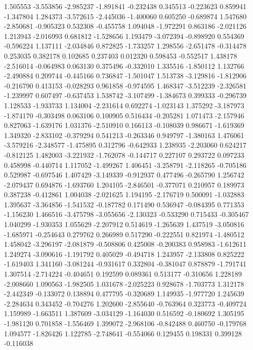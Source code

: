 1.505553
-3.553856
-2.985237
-1.891841
-0.232438
0.345513
-0.223623
0.859941
-1.347804
1.284373
-3.572615
-2.445036
-1.400060
0.605250
-0.689874
1.547680
-2.850681
-0.905323
0.532308
-0.455758
1.094048
-1.972291
0.863186
-2.021126
1.213943
-2.016993
0.681812
-1.528656
1.193479
-3.072394
-0.898920
0.554369
-0.596224
1.137111
-2.034846
0.872825
-1.733257
1.298556
-2.651478
-0.314478
0.253035
0.382178
0.102685
0.237403
0.012320
0.598453
-0.552517
1.438178
-2.516014
-0.064983
0.063130
0.375496
-0.332010
1.335516
-1.850112
1.132766
-2.490884
0.209744
-0.445166
0.736847
-1.501047
1.513738
-3.129816
-1.812906
-0.216790
0.413153
-0.028293
0.961858
-0.974595
1.468347
-3.512239
-2.326581
-1.239997
0.607497
-0.637453
1.538742
-3.107499
-1.384673
0.399333
-0.296739
1.128533
-1.933733
1.134004
-2.231614
0.692274
-1.023143
1.375292
-3.187973
-1.874170
-0.303498
0.063106
0.100905
0.516434
-0.205281
1.071473
-2.157946
0.827063
-1.639176
1.031376
-2.510910
0.166113
-0.108039
0.986671
-1.619369
1.349320
-2.833102
-0.379294
0.541213
-0.263346
0.949797
-1.380163
1.476061
-3.579216
-2.348577
-1.475895
0.312796
-0.642933
1.238935
-2.203060
0.624217
-0.812125
1.482003
-3.221932
-1.762078
-0.144717
0.227107
0.293722
0.097233
0.458998
-0.440714
1.117052
-1.499267
1.406451
-3.258791
-2.118265
-0.705186
0.529987
-0.697546
1.407429
-3.149339
-0.912937
0.477496
-0.265790
1.256742
-2.079437
0.694876
-1.693760
1.204105
-2.846501
-0.377071
0.210957
0.189973
0.387238
-0.412861
1.004038
-2.021625
1.194195
-2.176719
0.500091
-1.032883
1.395637
-3.364856
-1.541532
-0.187782
0.171490
0.536947
-0.084395
0.771353
-1.156230
1.466516
-3.475798
-3.055656
-2.130323
-0.533290
0.715433
-0.305467
1.040299
-1.930353
1.055629
-2.207912
0.514619
-1.265639
1.437519
-3.050816
-1.685971
-0.254643
0.279762
0.266989
0.517290
-0.222551
0.821974
-1.480512
1.458042
-3.296197
-2.081879
-0.508806
0.425008
-0.200383
0.958983
-1.612611
1.249274
-3.090616
-1.191792
0.405029
-0.494718
1.243957
-2.133808
0.825222
-1.619403
1.341160
-3.081244
-0.931617
0.332804
-0.381047
0.878879
-1.791741
1.307514
-2.714224
-0.404651
0.192599
0.089361
0.513177
-0.310656
1.228189
-2.008660
1.090563
-1.982505
1.031678
-2.025223
0.928678
-1.703773
1.312178
-2.442349
-0.133072
0.138894
0.477795
-0.320689
1.149935
-1.977720
1.245639
-2.284634
0.343452
-0.704276
1.202600
-2.855640
-0.763964
0.323773
-0.409724
1.159989
-1.663511
1.387609
-3.034129
-1.164030
0.516592
-0.180692
1.305195
-1.981120
0.701858
-1.556469
1.399072
-2.968106
-0.842488
0.460750
-0.179768
1.094577
-1.826426
1.122785
-2.748641
-0.554066
0.129455
0.198331
0.399128
-0.116038
